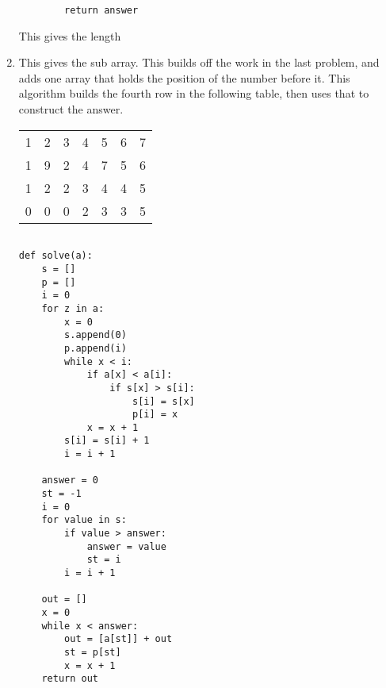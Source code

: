 \documentclass{article}
\begin{document}
\begin{enumerate}
\begin{lstlisting}
        return answer
    \end{lstlisting}
    This gives the length \\
  \item
  This gives the sub array. This builds off the work in the last problem, and adds one array that holds the position of the number before it. This algorithm builds the fourth row in the following table, then uses that to construct the answer. \\
   \begin{tabular}{lllllll}
    1 & 2  & 3  & 4  & 5  & 6 & 7  \\
    1 & 9  & 2  & 4  & 7  & 5 & 6  \\
    1 & 2  & 2  & 3  & 4  & 4 & 5  \\
    0 & 0  & 0  & 2  & 3  & 3 & 5  \\
    \end{tabular}
    \begin{lstlisting}
    
def solve(a):
    s = []
    p = []
    i = 0
    for z in a:
        x = 0
        s.append(0)
        p.append(i)
        while x < i:
            if a[x] < a[i]:
                if s[x] > s[i]:
                    s[i] = s[x]
                    p[i] = x
            x = x + 1
        s[i] = s[i] + 1
        i = i + 1

    answer = 0
    st = -1
    i = 0
    for value in s:
        if value > answer:
            answer = value
            st = i
        i = i + 1

    out = []
    x = 0
    while x < answer:
        out = [a[st]] + out
        st = p[st]
        x = x + 1
    return out

    \end{lstlisting}

  \end{enumerate}
  
\end{document}
